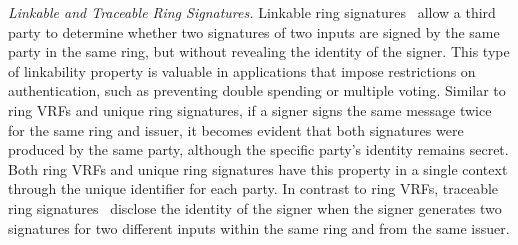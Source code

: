 
\smallskip
\noindent\textit{Linkable and Traceable Ring Signatures.} Linkable ring signatures~\cite{ring_linkable,ring_linkablee} allow a third party to determine whether two signatures of two inputs are signed by the same party in the same ring, but without revealing the identity of the signer. This type of linkability property is valuable in applications that impose restrictions on authentication, such as preventing double spending or multiple voting. Similar to ring VRFs and unique ring signatures, if a signer signs the same message twice for the same ring and issuer, it becomes evident that both signatures were produced by the same party, although the specific party's identity remains secret.  Both ring VRFs and unique ring signatures have this property in a single context through the unique identifier for each party.
In contrast to ring VRFs, traceable ring signatures~\cite{traceable07,traceable_sub} disclose the identity of the signer when the signer generates two signatures for two different inputs within the same ring and from the same issuer.

